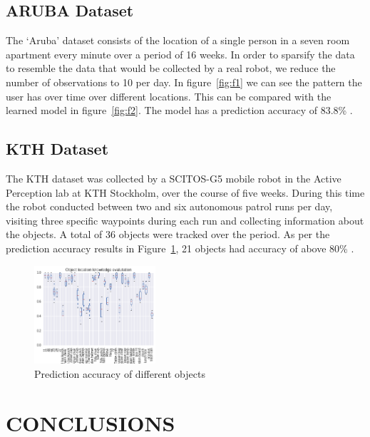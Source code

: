 \documentclass[a4paper, 10pt, conference]{ieeeconf}      %
\begin{document}
\subsection{ARUBA Dataset}
The  ‘Aruba’  dataset  consists of the location of a single person in a  seven room apartment every minute over a period of 16 weeks. In order to sparsify the data to resemble the data that would be collected by a real robot, we reduce the number of observations to 10 per day. In figure~\ref{fig:f1} we can see the pattern the user has over time over different locations. This can be compared with the learned model in figure~\ref{fig:f2}. The model has a prediction accuracy of 83.8\% .

\subsection{KTH Dataset}
The KTH dataset was collected by a SCITOS-G5 mobile robot in the Active Perception lab at KTH Stockholm, over  the  course  of  five  weeks.  During  this  time  the  robot conducted  between  two  and  six  autonomous  patrol  runs per  day,  visiting  three  specific waypoints  during  each  run and collecting information about the objects. A total of 36 objects were tracked over the period. As per the prediction accuracy results in Figure~\ref{fig:f3}, 21 objects had accuracy of above 80\% .
\begin{figure}[!tbp]
    \center
    \includegraphics[width=0.4\textwidth]{learning_evaluation.png}
    \caption{Prediction accuracy of different objects}
    \label{fig:f3}
\end{figure}


\section{CONCLUSIONS}
\end{document}
